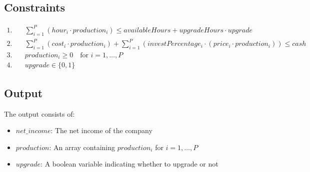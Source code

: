 \documentclass{article}
\begin{document}
\subsection*{Constraints}
\begin{align*}
1. & \quad \sum_{i=1}^{P} (hour_i \cdot production_i) \leq availableHours + upgradeHours \cdot upgrade \\
2. & \quad \sum_{i=1}^{P} (cost_i \cdot production_i) + \sum_{i=1}^{P} (investPercentage_i \cdot (price_i \cdot production_i)) \leq cash \\
3. & \quad production_i \geq 0 \quad \text{for } i=1,\ldots,P \\
4. & \quad upgrade \in \{0, 1\}
\end{align*}

\subsection*{Output}
The output consists of:
\begin{itemize}
    \item $net\_income$: The net income of the company
    \item $production$: An array containing $production_i$ for $i = 1, \ldots, P$
    \item $upgrade$: A boolean variable indicating whether to upgrade or not
\end{itemize}
\end{document}
